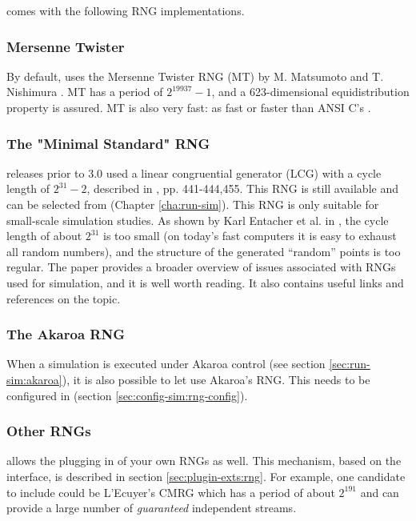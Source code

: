{\opp} comes with the following RNG implementations.

\subsubsection{Mersenne Twister}
\label{sec:sim-lib:mersenne-twister}

By default, {\opp} uses the Mersenne Twister RNG (MT) by M. Matsumoto and
T. Nishimura \cite{Matsumoto98}. MT has a period of $2^{19937}-1$,
and a 623-dimensional equidistribution property is assured. MT is
also very fast: as fast or faster than ANSI C's .

\subsubsection{The "Minimal Standard" RNG}
\label{sec:sim-lib:minimal-standard-rng}

{\opp} releases prior to 3.0 used a linear congruential generator
(LCG) with a cycle length of $2^{31}-2$, described in
\cite{Jain91}, pp. 441-444,455. This RNG is still available
and can be selected from  (Chapter \ref{cha:run-sim}).
This RNG is only suitable for small-scale simulation studies.
As shown by Karl Entacher et al. in \cite{Entacher02},
the cycle length of about $2^{31}$ is too small (on today's
fast computers it is easy to exhaust all random numbers), and
the structure of the generated ``random'' points is too regular.
The \cite{Hellekalek98} paper provides a broader overview of issues
associated with RNGs used for simulation, and it is well worth reading.
It also contains useful links and references on the topic.

\subsubsection{The Akaroa RNG}
\label{sec:sim-lib:akaroa-rng}

When a simulation is executed under Akaroa control (see section
\ref{sec:run-sim:akaroa}), it is also possible to let {\opp} use Akaroa's
RNG. This needs to be configured in  (section
\ref{sec:config-sim:rng-config}).

\subsubsection{Other RNGs}
\label{sec:sim-lib:other-rngs}

{\opp} allows the plugging in of your own RNGs as well. This mechanism,
based on the  interface, is described in section
\ref{sec:plugin-exts:rng}.
For example, one candidate to include could be L'Ecuyer's CMRG \cite{LEcuyer02}
which has a period of about $2^{191}$ and can provide a large
number of \textit{guaranteed} independent streams.

